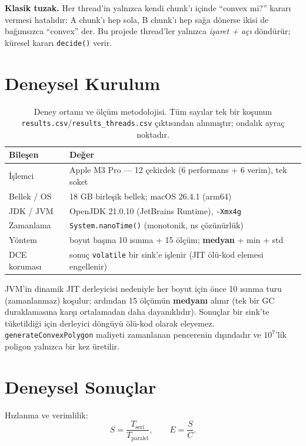 \documentclass[11pt,a4paper]{article}
\newcommand{\code}[1]{\texttt{\small #1}}
\begin{document}
\textbf{Klasik tuzak.} Her thread'in yalnızca kendi chunk'ı içinde ``convex mi?'' kararı vermesi
hatalıdır: A chunk'ı hep sola, B chunk'ı hep sağa dönerse ikisi de bağımsızca ``convex'' der.
Bu projede thread'ler yalnızca \emph{işaret + açı} döndürür; küresel kararı \code{decide()} verir.

\section{Deneysel Kurulum}\label{sec:method}

\begin{table}[h]
\centering\small
\begin{tabular}{@{}ll@{}}
\toprule
\textbf{Bileşen} & \textbf{Değer}\\
\midrule
İşlemci & Apple M3 Pro --- 12 çekirdek (6 performans + 6 verim), tek soket\\
Bellek / OS & 18 GB birleşik bellek; macOS 26.4.1 (arm64)\\
JDK / JVM & OpenJDK 21.0.10 (JetBrains Runtime), \code{-Xmx4g}\\
Zamanlama & \code{System.nanoTime()} (monotonik, ns çözünürlük)\\
Yöntem & boyut başına 10 ısınma + 15 ölçüm; \textbf{medyan} + min + std\\
DCE koruması & sonuç \code{volatile} bir sink'e işlenir (JIT ölü-kod elemesi engellenir)\\
\bottomrule
\end{tabular}
\caption{Deney ortamı ve ölçüm metodolojisi. Tüm sayılar tek bir koşunun
\code{results.csv}/\code{results\_threads.csv} çıktısından alınmıştır; ondalık ayraç noktadır.}
\label{tab:env}
\end{table}

JVM'in dinamik JIT derleyicisi nedeniyle her boyut için önce 10 ısınma turu (zamanlanmaz)
koşulur; ardından 15 ölçümün \textbf{medyanı} alınır (tek bir GC duraklamasına karşı ortalamadan
daha dayanıklıdır). Sonuçlar bir sink'te tüketildiği için derleyici döngüyü ölü-kod olarak
eleyemez. \code{generateConvexPolygon} maliyeti zamanlanan pencerenin dışındadır ve $10^{7}$'lik
poligon yalnızca bir kez üretilir.

\section{Deneysel Sonuçlar}

Hızlanma ve verimlilik:
\begin{equation}
S=\frac{T_{\text{seri}}}{T_{\text{paralel}}},\qquad E=\frac{S}{C}.
\end{equation}
\end{document}

